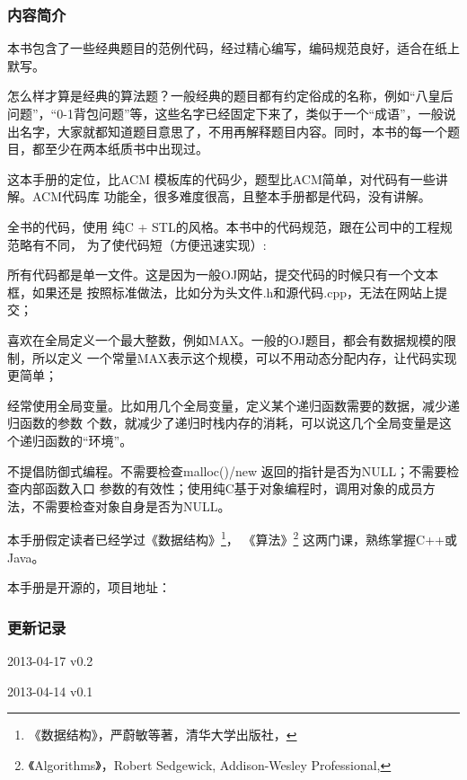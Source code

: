 \subsubsection{内容简介}
本书包含了一些经典题目的范例代码，经过精心编写，编码规范良好，适合在纸上默写。

怎么样才算是经典的算法题？一般经典的题目都有约定俗成的名称，例如“八皇后问题”，“0-1背包问题”等，这些名字已经固定下来了，类似于一个“成语”，一般说出名字，大家就都知道题目意思了，不用再解释题目内容。同时，本书的每一个题目，都至少在两本纸质书中出现过。

这本手册的定位，比ACM 模板库的代码少，题型比ACM简单，对代码有一些讲解。ACM代码库
功能全，很多难度很高，且整本手册都是代码，没有讲解。

全书的代码，使用 纯C + STL的风格。本书中的代码规范，跟在公司中的工程规范略有不同，
为了使代码短（方便迅速实现）:

\begindot
\item 所有代码都是单一文件。这是因为一般OJ网站，提交代码的时候只有一个文本框，如果还是
按照标准做法，比如分为头文件.h和源代码.cpp，无法在网站上提交；

\item 喜欢在全局定义一个最大整数，例如MAX。一般的OJ题目，都会有数据规模的限制，所以定义
一个常量MAX表示这个规模，可以不用动态分配内存，让代码实现更简单；

\item 经常使用全局变量。比如用几个全局变量，定义某个递归函数需要的数据，减少递归函数的参数
个数，就减少了递归时栈内存的消耗，可以说这几个全局变量是这个递归函数的“环境”。

\item 不提倡防御式编程。不需要检查malloc()/new 返回的指针是否为NULL；不需要检查内部函数入口
参数的有效性；使用纯C基于对象编程时，调用对象的成员方法，不需要检查对象自身是否为NULL。
\myenddot

本手册假定读者已经学过《数据结构》\footnote{《数据结构》，严蔚敏等著，清华大学出版社，
}，
《算法》\footnote{《Algorithms》，Robert Sedgewick, Addison-Wesley Professional, }
这两门课，熟练掌握C++或Java。

本手册是开源的，项目地址：


\subsubsection{更新记录}
\begindot
\item[] 2013-04-17 v0.2
\item[] 2013-04-14 v0.1
\myenddot
